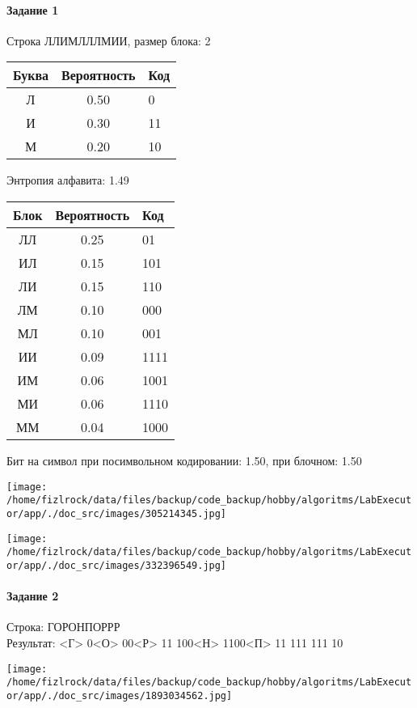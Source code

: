\documentclass[a4paper, 12pt]{article}
\begin{document}
\paragraph{Задание 1}

Строка ЛЛИМЛЛЛМИИ, размер блока: 2
\begin{center}
 \begin{tabular}{ |c|c|l| } 
  \hline
     Буква & Вероятность & Код\\ \hline
Л & 0.50 & 0\\\hline
И & 0.30 & 11\\\hline
М & 0.20 & 10
\\ \hline \end{tabular}
\end{center}
Энтропия алфавита: 1.49
\begin{center}
 \begin{tabular}{ |c|c|l| } 
  \hline
     Блок & Вероятность & Код\\ \hline
ЛЛ & 0.25 & 01\\\hline
ИЛ & 0.15 & 101\\\hline
ЛИ & 0.15 & 110\\\hline
ЛМ & 0.10 & 000\\\hline
МЛ & 0.10 & 001\\\hline
ИИ & 0.09 & 1111\\\hline
ИМ & 0.06 & 1001\\\hline
МИ & 0.06 & 1110\\\hline
ММ & 0.04 & 1000
\\ \hline \end{tabular}
\end{center}
Бит на символ при посимвольном кодировании: 1.50, при блочном: 1.50

\texttt{[image: /home/fizlrock/data/files/backup/code\_backup/hobby/algoritms/LabExecutor/app/./doc\_src/images/305214345.jpg]}

\texttt{[image: /home/fizlrock/data/files/backup/code\_backup/hobby/algoritms/LabExecutor/app/./doc\_src/images/332396549.jpg]}
\pagebreak
\paragraph{Задание 2}

Строка: 
ГОРОНПОРРР\\
Результат: <Г> 0<О> 00<Р> 11 100<Н> 1100<П> 11 111 111 10

\texttt{[image: /home/fizlrock/data/files/backup/code\_backup/hobby/algoritms/LabExecutor/app/./doc\_src/images/1893034562.jpg]}
\end{document}
